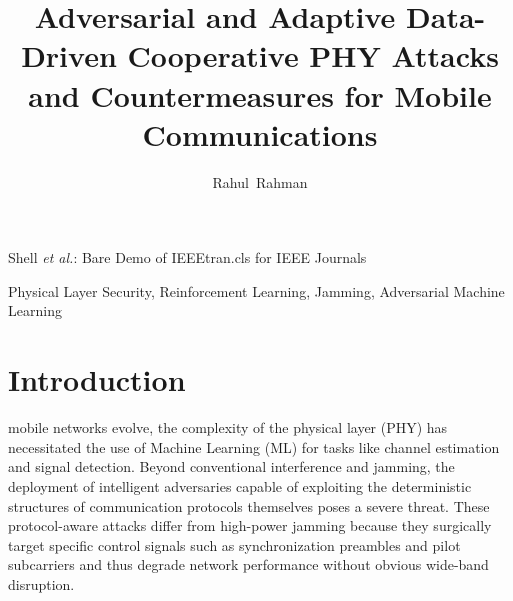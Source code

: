 \documentclass[conference]{IEEEtran}
\newcommand{\adm}[1]{{\color{orange}{[#1]}}}
\newcommand{\rar}[1]{{\color{blue}{[#1]}}}
\begin{document}
\title{Adversarial and Adaptive Data-Driven Cooperative PHY Attacks and Countermeasures for Mobile Communications}

\author{Rahul~Rahman}%

%
{Shell \MakeLowercase{\textit{et al.}}: Bare Demo of IEEEtran.cls for IEEE Journals}

\maketitle

\begin{abstract}
\rar{Write last.}
\end{abstract}


\begin{IEEEkeywords}
Physical Layer Security, Reinforcement Learning, Jamming, Adversarial Machine Learning
\end{IEEEkeywords}






%
\IEEEpeerreviewmaketitle


\section{Introduction}
 mobile networks evolve, the complexity of the physical layer (PHY) has necessitated the use of Machine Learning (ML) for tasks like channel estimation and signal detection. Beyond conventional interference and jamming, the deployment of intelligent adversaries capable of exploiting the deterministic structures of communication protocols themselves poses a severe threat.
These protocol-aware attacks differ from high-power jamming because they surgically target specific control signals such as synchronization preambles and pilot subcarriers and thus degrade network performance without obvious wide-band disruption.
\end{document}
